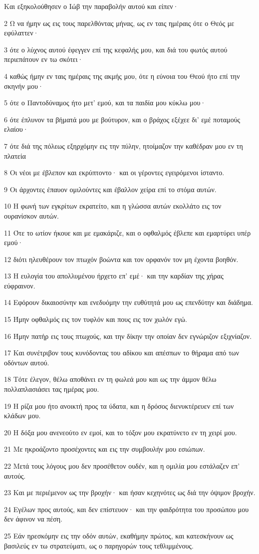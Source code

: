 \par Και εξηκολούθησεν ο Ιώβ την παραβολήν αυτού και είπεν·
\par 2 Ω να ήμην ως εις τους παρελθόντας μήνας, ως εν ταις ημέραις ότε ο Θεός με εφύλαττεν·
\par 3 ότε ο λύχνος αυτού έφεγγεν επί της κεφαλής μου, και διά του φωτός αυτού περιεπάτουν εν τω σκότει·
\par 4 καθώς ήμην εν ταις ημέραις της ακμής μου, ότε η εύνοια του Θεού ήτο επί την σκηνήν μου·
\par 5 ότε ο Παντοδύναμος ήτο μετ' εμού, και τα παιδία μου κύκλω μου·
\par 6 ότε έπλυνον τα βήματά μου με βούτυρον, και ο βράχος εξέχεε δι' εμέ ποταμούς ελαίου·
\par 7 ότε διά της πόλεως εξηρχόμην εις την πύλην, ητοίμαζον την καθέδραν μου εν τη πλατεία
\par 8 Οι νέοι με έβλεπον και εκρύπτοντο· και οι γέροντες εγειρόμενοι ίσταντο.
\par 9 Οι άρχοντες έπαυον ομιλούντες και έβαλλον χείρα επί το στόμα αυτών.
\par 10 Η φωνή των εγκρίτων εκρατείτο, και η γλώσσα αυτών εκολλάτο εις τον ουρανίσκον αυτών.
\par 11 Ότε το ωτίον ήκουε και με εμακάριζε, και ο οφθαλμός έβλεπε και εμαρτύρει υπέρ εμού·
\par 12 διότι ηλευθέρουν τον πτωχόν βοώντα και τον ορφανόν τον μη έχοντα βοηθόν.
\par 13 Η ευλογία του απολλυμένου ήρχετο επ' εμέ· και την καρδίαν της χήρας εύφραινον.
\par 14 Εφόρουν δικαιοσύνην και ενεδυόμην την ευθύτητά μου ως επενδύτην και διάδημα.
\par 15 Ήμην οφθαλμός εις τον τυφλόν και πους εις τον χωλόν εγώ.
\par 16 Ήμην πατήρ εις τους πτωχούς, και την δίκην την οποίαν δεν εγνώριζον εξιχνίαζον.
\par 17 Και συνέτριβον τους κυνόδοντας του αδίκου και απέσπων το θήραμα από των οδόντων αυτού.
\par 18 Τότε έλεγον, θέλω αποθάνει εν τη φωλεά μου και ως την άμμον θέλω πολλαπλασιάσει τας ημέρας μου.
\par 19 Η ρίζα μου ήτο ανοικτή προς τα ύδατα, και η δρόσος διενυκτέρευεν επί των κλάδων μου.
\par 20 Η δόξα μου ανενεούτο εν εμοί, και το τόξον μου εκρατύνετο εν τη χειρί μου.
\par 21 Με ηκροάζοντο προσέχοντες και εις την συμβουλήν μου εσιώπων.
\par 22 Μετά τους λόγους μου δεν προσέθετον ουδέν, και η ομιλία μου εστάλαζεν επ' αυτούς.
\par 23 Και με περιέμενον ως την βροχήν· και ήσαν κεχηνότες ως διά την όψιμον βροχήν.
\par 24 Εγέλων προς αυτούς, και δεν επίστευον· και την φαιδρότητα του προσώπου μου δεν άφινον να πέση.
\par 25 Εάν ηρεσκόμην εις την οδόν αυτών, εκαθήμην πρώτος, και κατεσκήνουν ως βασιλεύς εν τω στρατεύματι, ως ο παρηγορών τους τεθλιμμένους.

